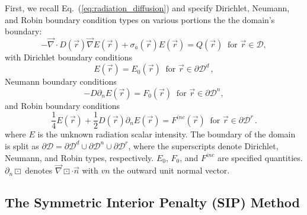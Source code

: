 \documentclass[preprint,10pt]{elsarticle}
\renewcommand{\div}{\vec{\nabla}\! \cdot \!}
\newcommand{\grad}{\vec{\nabla}}
\newcommand{\D}{\mathcal{D}}
\newcommand{\vr}{\vec{r}}
\newcommand{\vn}{\vec{n}}
\newcommand{\eqt}[1]{Eq.~(\ref{#1})}                     %
\begin{document}
First, we recall \eqt{eq:radiation_diffusion} and specify 
Dirichlet, Neumann, and Robin boundary condition types on various portions the the domain's
boundary:
\begin{equation}
  -\div D(\vr) \grad E(\vr) + \sigma_a(\vr) E(\vr) = Q(\vr)\ \textrm{ for } \vr \in \D,
\end{equation}
with Dirichlet boundary conditions
\begin{equation}
  E(\vr)  = E_0(\vr)\ \textrm{ for } \vr \in  \partial \D^d \, ,
\end{equation}
Neumann boundary conditions
\begin{equation}
  -D \partial_n E(\vr) = F_0(\vr) \ \textrm{ for } \vr \in \partial \D^n,
\end{equation}
and Robin boundary conditions
\begin{equation}
  \frac{1}{4}E(\vr) + \frac{1}{2} D(\vr) \partial_n E(\vr) = F^{inc}(\vr) \ \textrm{ for } \vr \in  \partial \D^r \, .
\end{equation}
%
where $E$ is the unknown radiation scalar intensity. The boundary of the domain is split as
$\partial \D = \partial \D^d \cup \partial \D^n \cup \partial \D^r$,  where the superscripts
denote Dirichlet, Neumann, and Robin types, respectively. $E_0$, $F_0$, and $F^{inc}$ are specified
quantities. $\partial_n \boxdot$ denotes $ \grad \boxdot \cdot \vn$ with $vn$ the outward unit normal vector.


\subsection{The Symmetric Interior Penalty (SIP) Method}
\end{document}
